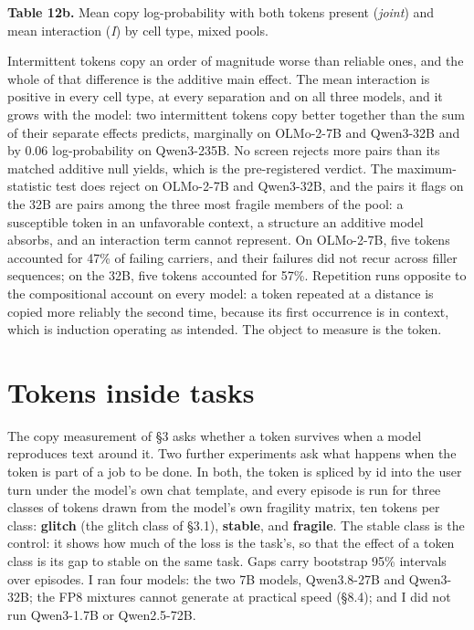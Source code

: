 \documentclass[11pt]{article}
\newenvironment{tabcaption}{\par\vspace{3pt}\small\setlength{\parindent}{0pt}\ignorespaces}{\par\vspace{14pt}}
\begin{document}
\begin{tabcaption}
\textbf{Table 12b.} Mean copy log-probability with both tokens present (\emph{joint}) and mean interaction (\emph{I}) by cell type, mixed pools.
\end{tabcaption}

Intermittent tokens copy an order of magnitude worse than reliable ones, and the whole of that difference is the additive main effect. The mean interaction is positive in every cell type, at every separation and on all three models, and it grows with the model: two intermittent tokens copy better together than the sum of their separate effects predicts, marginally on OLMo-2-7B and Qwen3-32B and by 0.06 log-probability on Qwen3-235B. No screen rejects more pairs than its matched additive null yields, which is the pre-registered verdict. The maximum-statistic test does reject on OLMo-2-7B and Qwen3-32B, and the pairs it flags on the 32B are pairs among the three most fragile members of the pool: a susceptible token in an unfavorable context, a structure an additive model absorbs, and an interaction term cannot represent. On OLMo-2-7B, five tokens accounted for 47\% of failing carriers, and their failures did not recur across filler sequences; on the 32B, five tokens accounted for 57\%. Repetition runs opposite to the compositional account on every model: a token repeated at a distance is copied more reliably the second time, because its first occurrence is in context, which is induction operating as intended. The object to measure is the token.

\section{Tokens inside tasks}\label{tokens-inside-tasks}

The copy measurement of §3 asks whether a token survives when a model reproduces text around it. Two further experiments ask what happens when the token is part of a job to be done. In both, the token is spliced by id into the user turn under the model's own chat template, and every episode is run for three classes of tokens drawn from the model's own fragility matrix, ten tokens per class: \textbf{glitch} (the glitch class of §3.1), \textbf{stable}, and \textbf{fragile}. The stable class is the control: it shows how much of the loss is the task's, so that the effect of a token class is its gap to stable on the same task. Gaps carry bootstrap 95\% intervals over episodes. I ran four models: the two 7B models, Qwen3.8-27B and Qwen3-32B; the FP8 mixtures cannot generate at practical speed (§8.4); and I did not run Qwen3-1.7B or Qwen2.5-72B.
\end{document}

